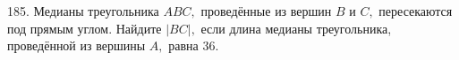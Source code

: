 185. Медианы треугольника $ABC,$ проведённые из вершин $B$ и $C,$ пересекаются под прямым углом. Найдите $|BC|,$ если длина медианы треугольника, проведённой из вершины $A,$ равна 36.\\
